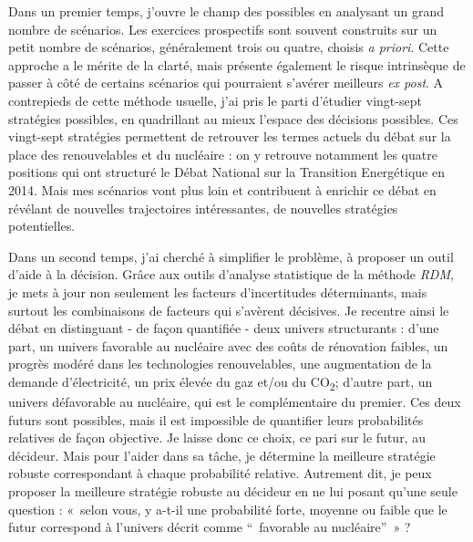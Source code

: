 Dans un premier temps, j'ouvre le champ des possibles en analysant un grand nombre de scénarios. Les exercices prospectifs sont souvent construits sur un petit nombre de scénarios, généralement trois ou quatre, choisis \textit{a priori}. Cette approche a le mérite de la clarté, mais présente également le risque intrinsèque de passer à côté de certains scénarios qui pourraient s'avérer meilleurs \textit{ex post}.
A contrepieds de cette méthode usuelle, j'ai pris le parti d'étudier vingt-sept stratégies possibles, en quadrillant au mieux l'espace des décisions possibles. Ces vingt-sept stratégies permettent de retrouver les termes actuels du débat sur la place des renouvelables et du nucléaire : on y retrouve notamment les quatre positions qui ont structuré le Débat National sur la Transition Energétique en 2014. Mais mes scénarios vont plus loin et contribuent à enrichir ce débat en révélant de nouvelles trajectoires intéressantes, de nouvelles stratégies potentielles. 

Dans un second temps, j'ai cherché à simplifier le problème, à proposer un outil d'aide à la décision. Grâce aux outils d'analyse statistique de la méthode \textit{RDM}, je mets à jour non seulement les facteurs d'incertitudes déterminants, mais surtout les combinaisons de facteurs qui s'avèrent décisives.
Je recentre ainsi le débat en distinguant - de façon quantifiée - deux univers structurants : d'une part, un univers favorable au nucléaire avec des coûts de rénovation faibles, un progrès modéré dans les technologies renouvelables, une augmentation de la demande d'électricité, un prix élevée du gaz et/ou du CO\textsubscript{2}; d'autre part, un univers défavorable au nucléaire, qui est le complémentaire du premier.
Ces deux futurs sont possibles, mais il est impossible de quantifier leurs probabilités relatives de façon objective. Je laisse donc ce choix, ce pari sur le futur, au décideur. 
Mais pour l'aider dans sa tâche, je détermine la meilleure stratégie robuste correspondant à chaque probabilité relative. Autrement dit, je peux proposer la meilleure stratégie robuste au décideur en ne lui posant qu'une seule question : «~selon vous, y a-t-il une probabilité forte, moyenne ou faible que le futur correspond à l'univers décrit comme “~favorable au nucléaire”~» ?
 
